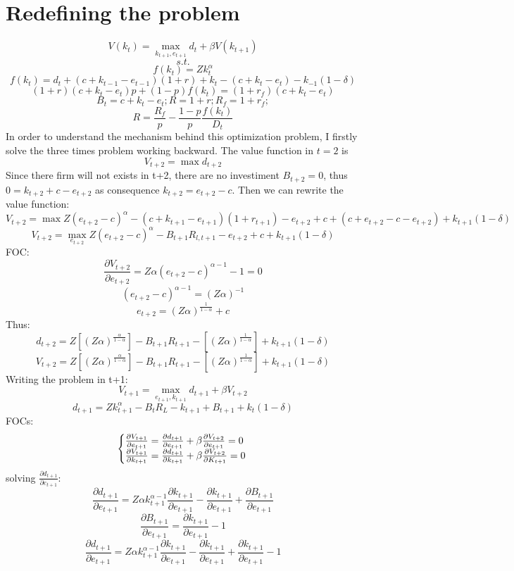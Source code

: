 \documentclass[12pt]{article}
\begin{document}
\section{Redefining the problem}
\[V(k_{t}) = \max_{k_{t+1}, e_{t+1}} d_t + \beta V(k_{t+1})\]
\[s.t.\]
\[f(k_t) = Z k_t^\alpha\]
\[f(k_t) = d_t + (c+k_{t-1}-e_{t-1})(1+r) + k_{t} - (c + k_{t}- e_{t}) - k_{-1}(1-\delta)\]
\[(1+r)(c+k_t -e_t)p + (1-p)f(k_t) = (1+r_f)(c+k_t -e_t) \]
\[B_t = c+k_t-e_t; R= 1+r; R_f= 1 + r_f;  \]
\[R=\frac{R_f}{p}  -\frac{ 1-p }{ p }\frac{f(k_t)}{D_t}\]
In order to understand the mechanism behind this optimization problem, I firstly solve the three times problem working
backward.
The value function in \(t=2\) is 
\[ V_{t+2} =  \max d_{t+2}\]
Since there firm will not exists in t+2, there are no investiment \(B_{t+2}=0\), thus \(0=k_{t+2}+c-e_{t+2}\) as
consequence \(k_{t+2} = e_{t+2} - c\). Then we can rewrite the value function:
\[ V_{t+2} = \max Z(e_{t+2} - c)^\alpha - (c+k_{t+1}-e_{t+1})(1+r_{t+1}) - e_{t+2} + c + (c + e_{t+2} - c - e_{t+2}) +
k_{t+1}(1-\delta) \]
\[V_{t+2} = \max_{e_{t+2}} Z(e_{t+2} - c)^\alpha - B_{t+1}R_{l,t+1} - e_{t+2} + c + k_{t+1}(1-\delta) \]
FOC:
\[\frac{\partial V_{t+2}}{\partial e_{t+2}} = Z \alpha (e_{t+2} - c)^{\alpha-1} - 1 = 0\]
\[ (e_{t+2} - c)^{\alpha-1}= (Z \alpha)^{-1}\]
\[ e_{t+2} = (Z \alpha)^{\frac{1}{1-\alpha}}+c\]
Thus:
\[d_{t+2} = Z\left[(Z \alpha)^{\frac{\alpha}{1-\alpha}}\right]  - B_{t+1}R_{t+1} -  \left[(Z
\alpha)^{\frac{1}{1-\alpha}}\right] + k_{t+1}(1-\delta) \]
\[V_{t+2} = Z\left[(Z \alpha)^{\frac{\alpha}{1-\alpha}}\right]  - B_{t+1}R_{t+1} -  \left[(Z
\alpha)^{\frac{1}{1-\alpha}}\right] + k_{t+1}(1-\delta) \]
Writing the problem in t+1:
\[V_{t+1} = \max_{e_{t+1},k_{t+1}} d_{t+1} + \beta V_{t+2}\]
\[d_{t+1} = Zk^\alpha_{t+1} - B_t R_L - k_{t+1} + B_{t+1} + k_t(1-\delta)\]
FOCs:
\begin{equation}
    \left\{\begin{array}{@{}l@{}}
        \frac{\partial V_{t+1}}{\partial e_{t+1}} = \frac{\partial d_{t+1}}{\partial e_{t+1}} + \beta \frac{\partial
            V_{t+2}}{\partial e_{t+1}} = 0  \\
        \frac{\partial V_{t+1}}{\partial k_{t+1}} = \frac{\partial d_{t+1}}{\partial k_{t+1}} + \beta \frac{\partial
            V_{t+2}}{\partial K_{t+1}} = 0 \\
    \end{array} \right .\,
\end{equation}
solving \(\frac{\partial d_{t+1}}{\partial e_{t+1}}\):
\[\frac{\partial d_{t+1}}{\partial e_{t+1}} = Z \alpha k_{t+1} ^{\alpha-1}\frac{\partial k_{t+1}}{\partial e_{t+1}}
 - \frac{\partial k_{t+1}}{\partial e_{t+1}} + \frac{\partial B_{t+1}}{\partial e_{t+1}}\]
\[\frac{\partial B_{t+1}}{\partial e_{t+1}} = \frac{\partial k_{t+1}}{\partial e_{t+1}} - 1\]
\[\frac{\partial d_{t+1}}{\partial e_{t+1}} = Z \alpha k_{t+1} ^{\alpha-1}\frac{\partial k_{t+1}}{\partial e_{t+1}} -
\frac{\partial k_{t+1}}{\partial e_{t+1}} + \frac{\partial k_{t+1}}{\partial e_{t+1}} - 1\]
\end{document}
